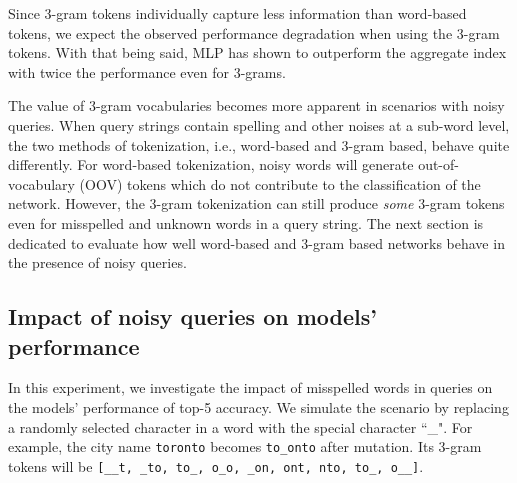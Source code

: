 \documentclass[conference]{IEEEtran}
\begin{document}
Since 3-gram tokens individually capture less information than word-based tokens, we expect the observed performance degradation when using the 3-gram tokens. With that being said, MLP has shown to outperform the aggregate index with twice the performance even for 3-grams.

The value of 3-gram vocabularies becomes more apparent in scenarios with noisy queries.  When query strings contain spelling and other noises at a sub-word level, the two methods of tokenization, i.e., word-based and 3-gram based, behave quite differently.
For word-based tokenization, noisy words will generate out-of-vocabulary (OOV) tokens
which do not contribute to the classification of the network.  However, the 3-gram tokenization can still produce {\em some} 3-gram tokens even for misspelled and unknown words in a query string.  The next section is dedicated to evaluate how well word-based and 3-gram based networks behave in the presence of noisy queries.

\subsection{Impact of noisy queries on models' performance}
\label{subsection:expt_3gram_resiliency}


In this experiment, we investigate the impact of misspelled words in queries on the models' performance of top-5 accuracy. We simulate the scenario by replacing a randomly selected character in a word with the special character ``\_". For example, the city name \verb|toronto| becomes \verb|to_onto| after mutation. Its 3-gram tokens will be \verb|[__t, _to, to_, o_o, _on, ont, nto, to_, o__]|.

\end{document}

